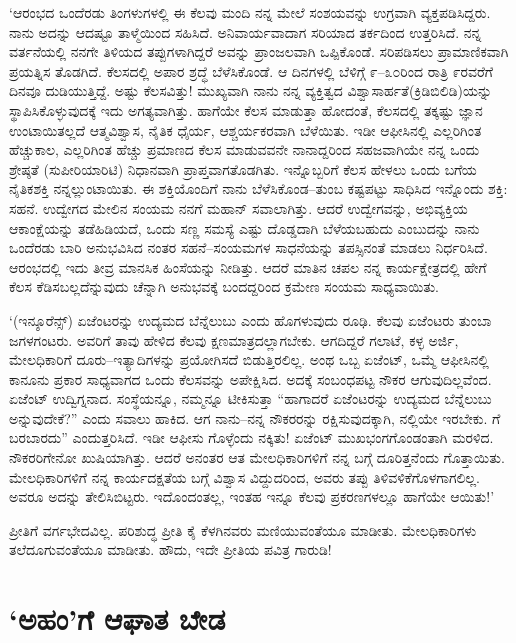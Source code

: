 ‘ಆರಂಭದ ಒಂದೆರಡು ತಿಂಗಳುಗಳಲ್ಲಿ ಈ ಕೆಲವು ಮಂದಿ ನನ್ನ ಮೇಲೆ ಸಂಶಯವನ್ನು ಉಗ್ರವಾಗಿ ವ್ಯಕ್ತಪಡಿಸಿದ್ದರು. ನಾನು ಅದನ್ನು ಆದಷ್ಟೂ ತಾಳ್ಮೆಯಿಂದ ಸಹಿಸಿದೆ. ಅನಿವಾರ್ಯ\-ವಾದಾಗ ಸರಿಯಾದ ತರ್ಕದಿಂದ ಉತ್ತರಿಸಿದೆ. ನನ್ನ ವರ್ತನೆಯಲ್ಲಿ ನನಗೇ ತಿಳಿಯದ ತಪ್ಪುಗಳಾಗಿದ್ದರೆ ಅವನ್ನು ಪ್ರಾಂಜಲವಾಗಿ ಒಪ್ಪಿಕೊಂಡೆ. ಸರಿಪಡಿಸಲು ಪ್ರಾಮಾಣಿಕವಾಗಿ ಪ್ರಯತ್ನಿಸ ತೊಡಗಿದೆ. ಕೆಲಸದಲ್ಲಿ ಅಪಾರ ಶ್ರದ್ಧೆ ಬೆಳೆಸಿಕೊಂಡೆ. ಆ ದಿನಗಳಲ್ಲಿ ಬೆಳಿಗ್ಗೆ ೯–೩೦ರಿಂದ ರಾತ್ರಿ ೯ರವರೆಗೆ ದಿನವೂ ದುಡಿಯುತ್ತಿದ್ದೆ. ಅಷ್ಟು ಕೆಲಸವಿತ್ತು! ಮುಖ್ಯವಾಗಿ ನಾನು ನನ್ನ ವ್ಯಕ್ತಿತ್ವದ ವಿಶ್ವಾಸಾರ್ಹತೆ(ಕ್ರಿಡಿಬಿಲಿಡಿ)ಯನ್ನು ಸ್ಥಾಪಿಸಿಕೊಳ್ಳುವುದಕ್ಕೆ ಇದು ಅಗತ್ಯವಾಗಿತ್ತು. ಹಾಗೆಯೇ ಕೆಲಸ ಮಾಡುತ್ತಾ ಹೋದಂತೆ, ಕೆಲಸದಲ್ಲಿ ತಕ್ಕಷ್ಟು ಜ್ಞಾನ ಉಂಟಾಯಿತಲ್ಲದೆ ಆತ್ಮವಿಶ್ವಾಸ, ನೈತಿಕ ಧೈರ್ಯ, ಆಶ್ಚರ್ಯಕರವಾಗಿ ಬೆಳೆಯಿತು. ಇಡೀ ಆಫೀಸಿನಲ್ಲಿ ಎಲ್ಲರಿಗಿಂತ ಹೆಚ್ಚುಕಾಲ, ಎಲ್ಲರಿಗಿಂತ ಹೆಚ್ಚು ಪ್ರಮಾಣದ ಕೆಲಸ ಮಾಡುವವನೇ ನಾನಾದ್ದರಿಂದ ಸಹಜವಾಗಿಯೇ ನನ್ನ ಒಂದು ಶ್ರೇಷ್ಠತೆ (ಸುಪೀರಿಯಾರಿಟಿ) ನಿಧಾನವಾಗಿ ಪ್ರಾಪ್ತವಾಗತೊಡಗಿತು. ಇನ್ನೊಬ್ಬರಿಗೆ ಕೆಲಸ ಹೇಳಲು ಒಂದು ಬಗೆಯ ನೈತಿಕಶಕ್ತಿ ನನ್ನಲ್ಲುಂಟಾಯಿತು. ಈ ಶಕ್ತಿಯೊಂದಿಗೆ ನಾನು ಬೆಳೆಸಿಕೊಂಡ–ತುಂಬ ಕಷ್ಟಪಟ್ಟು ಸಾಧಿಸಿದ ಇನ್ನೊಂದು ಶಕ್ತಿ: ಸಹನೆ. ಉದ್ವೇಗದ ಮೇಲಿನ ಸಂಯಮ ನನಗೆ ಮಹಾನ್ ಸವಾಲಾಗಿತ್ತು. ಆದರೆ ಉದ್ವೇಗವನ್ನು, ಅಭಿವ್ಯಕ್ತಿಯ ಆಕಾಂಕ್ಷೆಯನ್ನು ತಡೆಹಿಡಿಯದೆ, ಒಂದು ಸಣ್ಣ ಸಮಸ್ಯೆ ಎಷ್ಟು ದೊಡ್ಡದಾಗಿ ಬೆಳೆಯಬಹುದು ಎಂಬುದನ್ನು ನಾನು ಒಂದೆರಡು ಬಾರಿ ಅನುಭವಿಸಿದ ನಂತರ ಸಹನೆ–ಸಂಯಮಗಳ ಸಾಧನೆಯನ್ನು ತಪಸ್ಸಿನಂತೆ ಮಾಡಲು ನಿರ್ಧರಿಸಿದೆ. ಆರಂಭದಲ್ಲಿ ಇದು ತೀವ್ರ ಮಾನಸಿಕ ಹಿಂಸೆಯನ್ನು ನೀಡಿತ್ತು. ಆದರೆ ಮಾತಿನ ಚಪಲ ನನ್ನ ಕಾರ್ಯಕ್ಷೇತ್ರದಲ್ಲಿ ಹೇಗೆ ಕೆಲಸ ಕೆಡಿಸಬಲ್ಲದೆನ್ನುವುದು ಚೆನ್ನಾಗಿ ಅನುಭವಕ್ಕೆ ಬಂದದ್ದರಿಂದ ಕ್ರಮೇಣ ಸಂಯಮ ಸಾಧ್ಯವಾಯಿತು.

‘(ಇನ್ಶೂರೆನ್ಸ್​) ಏಜೆಂಟರನ್ನು ಉದ್ಯಮದ ಬೆನ್ನೆಲುಬು ಎಂದು ಹೊಗಳುವುದು ರೂಢಿ. ಕೆಲವು ಏಜೆಂಟರು ತುಂಬಾ ಜಗಳಗಂಟರು. ಅವರಿಗೆ ತಾವು ಹೇಳಿದ ಕೆಲವು ಕ್ಷಣಮಾತ್ರದಲ್ಲಾಗಬೇಕು. ಆಗದಿದ್ದರೆ ಗಲಾಟೆ, ಕಳ್ಳ ಅರ್ಜಿ, ಮೇಲಧಿಕಾರಿಗೆ ದೂರು–ಇತ್ಯಾದಿಗಳನ್ನು ಪ್ರಯೋಗಿಸದೆ ಬಿಡುತ್ತಿರಲಿಲ್ಲ. ಅಂಥ ಒಬ್ಬ ಏಜೆಂಟ್, ಒಮ್ಮೆ ಆಫೀಸಿನಲ್ಲಿ ಕಾನೂನು ಪ್ರಕಾರ ಸಾಧ್ಯವಾಗದ ಒಂದು ಕೆಲಸವನ್ನು ಅಪೇಕ್ಷಿಸಿದ. ಅದಕ್ಕೆ ಸಂಬಂಧಪಟ್ಟ ನೌಕರ ಆಗುವುದಿಲ್ಲವೆಂದ. ಏಜೆಂಟ್ ಉದ್ವಿಗ್ನನಾದ. ಸಂಸ್ಥೆಯನ್ನೂ, ನಮ್ಮನ್ನೂ ಟೀಕಿಸುತ್ತಾ “ಹಾಗಾದರೆ ಏಜೆಂಟರನ್ನು ಉದ್ಯಮದ ಬೆನ್ನೆಲುಬು ಅನ್ನುವುದೇಕೆ?” ಎಂದು ಸವಾಲು ಹಾಕಿದ. ಆಗ ನಾನು–ನನ್ನ ನೌಕರರನ್ನು ರಕ್ಷಿಸುವುದಕ್ಕಾಗಿ, ನಲ್ಲಿಯೇ ಇರಬೇಕು. ಗೆ ಬರಬಾರದು” ಎಂದುತ್ತರಿ\-ಸಿದೆ. ಇಡೀ ಆಫೀಸು ಗೊಳ್ಳೆಂದು ನಕ್ಕಿತು! ಏಜೆಂಟ್ ಮುಖಭಂಗಗೊಂಡಂತಾಗಿ ಮರಳಿದ. ನೌಕರರಿಗೇನೋ ಖುಷಿಯಾಗಿತ್ತು. ಆದರೆ ಅನಂತರ ಆತ ಮೇಲಧಿಕಾರಿಗಳಿಗೆ ನನ್ನ ಬಗ್ಗೆ ದೂರಿತ್ತನೆಂದು ಗೊತ್ತಾಯಿತು. ಮೇಲಧಿಕಾರಿಗಳಿಗೆ ನನ್ನ ಕಾರ್ಯದಕ್ಷತೆಯ ಬಗ್ಗೆ ವಿಶ್ವಾಸ ವಿದ್ದುದರಿಂದ, ಅವರು ತಪ್ಪು ತಿಳಿವಳಿಕೆಗೊಳಗಾಗಲಿಲ್ಲ. ಅವರೂ ಅದನ್ನು ತೇಲಿಸಿಬಿಟ್ಟರು. ಇದೊಂದಂತಲ್ಲ, ಇಂತಹ ಇನ್ನೂ ಕೆಲವು ಪ್ರಕರಣಗಳಲ್ಲೂ ಹಾಗೆಯೇ ಆಯಿತು!’

ಪ್ರೀತಿಗೆ ವರ್ಗಭೇದವಿಲ್ಲ. ಪರಿಶುದ್ಧ ಪ್ರೀತಿ ಕೈ ಕೆಳಗಿನವರು ಮಣಿಯುವಂತೆಯೂ ಮಾಡೀತು. ಮೇಲಧಿಕಾರಿಗಳು ತಲೆದೂಗುವಂತೆಯೂ ಮಾಡೀತು. ಹೌದು, ಇದೇ ಪ್ರೀತಿಯ ಪವಿತ್ರ ಗಾರುಡಿ!


\section*{‘ಅಹಂ’ಗೆ ಆಘಾತ ಬೇಡ}

